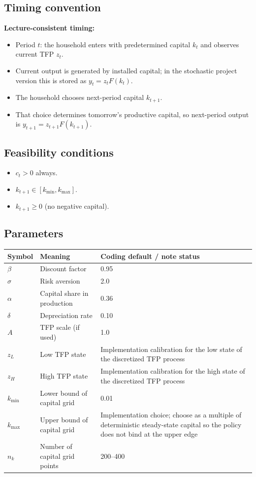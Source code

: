 \documentclass[11pt]{article}
\begin{document}
\subsection{Timing convention}

\begin{warningbox}
\textbf{Lecture-consistent timing:}
\begin{itemize}
    \item Period $t$: the household enters with predetermined capital $k_t$ and observes current TFP $z_t$.
    \item Current output is generated by installed capital; in the stochastic project version this is stored as $y_t = z_t F(k_t)$.
    \item The household chooses next-period capital $k_{t+1}$.
    \item That choice determines tomorrow's productive capital, so next-period output is $y_{t+1} = z_{t+1}F(k_{t+1})$.
\end{itemize}
\end{warningbox}

\subsection{Feasibility conditions}
\begin{itemize}
    \item $c_t > 0$ always.
    \item $k_{t+1} \in [k_{\min}, k_{\max}]$.
    \item $k_{t+1} \geq 0$ (no negative capital).
\end{itemize}

\subsection{Parameters}

\begin{tabularx}{\linewidth}{@{}lXl@{}}
\toprule
\textbf{Symbol} & \textbf{Meaning} & \textbf{Coding default / note status} \\
\midrule
$\beta$ & Discount factor & 0.95 \\
$\sigma$ & Risk aversion & 2.0 \\
$\alpha$ & Capital share in production & 0.36 \\
$\delta$ & Depreciation rate & 0.10 \\
$A$ & TFP scale (if used) & 1.0 \\
$z_L$ & Low TFP state & Implementation calibration for the low state of the discretized TFP process \\
$z_H$ & High TFP state & Implementation calibration for the high state of the discretized TFP process \\
$k_{\min}$ & Lower bound of capital grid & 0.01 \\
$k_{\max}$ & Upper bound of capital grid & Implementation choice; choose as a multiple of deterministic steady-state capital so the policy does not bind at the upper edge \\
$n_k$ & Number of capital grid points & 200--400 \\
\bottomrule
\end{tabularx}
\end{document}
